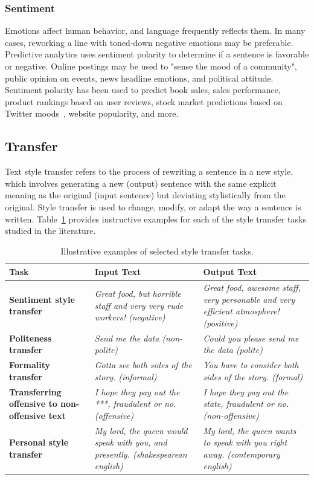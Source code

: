 \documentclass[akbc,twoside,11pt]{article}
\begin{document}
\subsubsection{Sentiment}

Emotions affect human behavior, and language frequently reflects them. In many cases, reworking a line with toned-down negative emotions may be preferable. Predictive analytics uses sentiment polarity to determine if a sentence is favorable or negative. Online postings may be used to "sense the mood of a community", public opinion on events, news headline emotions, and political attitude. Sentiment polarity has been used to predict book sales, sales performance, product rankings based on user reviews, stock market predictions based on Twitter moods~\cite{bollen2011twitter}, website popularity, and more.

\subsection{Transfer}

Text style transfer refers to the process of rewriting a sentence in a new style, which involves generating a new (output) sentence with the same explicit meaning as the original (input sentence) but deviating stylistically from the original. Style transfer is used to change, modify, or adapt the way a sentence is written. Table~\ref{tab:tasks} provides instructive examples for each of the style transfer tasks studied in the literature.

\begin{table}
\centering
\begin{tabularx}{\textwidth} { 
  | >{\raggedright\arraybackslash}X 
  | >{\centering\arraybackslash}X 
  | >{\raggedleft\arraybackslash}X | }
\hline
\textbf{Task} & \textbf{Input Text} & \textbf{Output Text} \\ \hline
\textbf{Sentiment style transfer} & \textit{Great food, but horrible staff and very very rude workers! (negative)} & \textit{Great food, awesome staff, very personable and very efficient atmosphere! (positive)} \\ \hline
\textbf{Politeness transfer} & \textit{Send me the data (non-polite)} & \textit{Could you please send me the data (polite)} \\ \hline
\textbf{Formality transfer} & \textit{Gotta see both sides of the story. (informal)} & \textit{You have to consider both sides of the story. (formal)} \\ \hline
\textbf{Transferring offensive to non-offensive text} & \textit{I hope they pay out the ***, fraudulent or no. (offensive)} & \textit{I hope they pay out the state,	fraudulent or no. (non-offensive)} \\ \hline
\textbf{Personal style transfer} & \textit{My lord, the queen would speak with you, and presently. (shakespearean english)} & \textit{My lord, the queen wants to speak with you right away. (contemporary english)} \\ \hline\end{tabularx}
\caption{\label{tab:tasks} Illustrative examples of selected style transfer tasks.}
\end{table}
\end{document}
